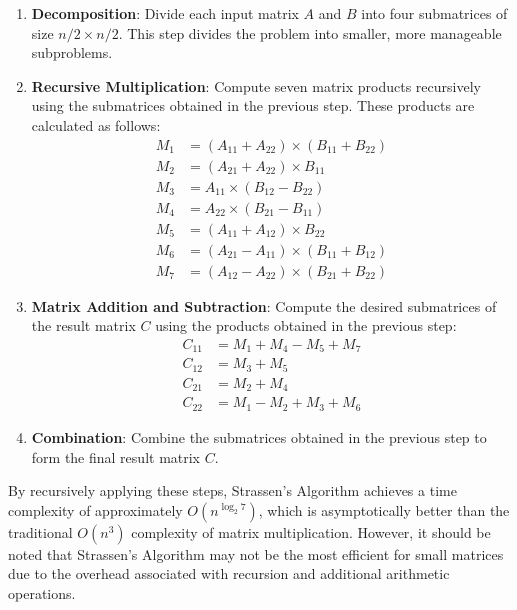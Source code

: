 \documentclass[12pt]{book} %
\begin{document}
\begin{enumerate}
    \item \textbf{Decomposition}: Divide each input matrix $A$ and $B$ into four submatrices of size $n/2 \times n/2$. This step divides the problem into smaller, more manageable subproblems.
    
    \item \textbf{Recursive Multiplication}: Compute seven matrix products recursively using the submatrices obtained in the previous step. These products are calculated as follows:
    \begin{align*}
        M_1 &= (A_{11} + A_{22}) \times (B_{11} + B_{22}) \\
        M_2 &= (A_{21} + A_{22}) \times B_{11} \\
        M_3 &= A_{11} \times (B_{12} - B_{22}) \\
        M_4 &= A_{22} \times (B_{21} - B_{11}) \\
        M_5 &= (A_{11} + A_{12}) \times B_{22} \\
        M_6 &= (A_{21} - A_{11}) \times (B_{11} + B_{12}) \\
        M_7 &= (A_{12} - A_{22}) \times (B_{21} + B_{22})
    \end{align*}
    
    \item \textbf{Matrix Addition and Subtraction}: Compute the desired submatrices of the result matrix $C$ using the products obtained in the previous step:
    \begin{align*}
        C_{11} &= M_1 + M_4 - M_5 + M_7 \\
        C_{12} &= M_3 + M_5 \\
        C_{21} &= M_2 + M_4 \\
        C_{22} &= M_1 - M_2 + M_3 + M_6
    \end{align*}
    
    \item \textbf{Combination}: Combine the submatrices obtained in the previous step to form the final result matrix $C$.
\end{enumerate}

By recursively applying these steps, Strassen's Algorithm achieves a time complexity of approximately $O(n^{\log_2{7}})$, which is asymptotically better than the traditional $O(n^3)$ complexity of matrix multiplication. However, it should be noted that Strassen's Algorithm may not be the most efficient for small matrices due to the overhead associated with recursion and additional arithmetic operations.
\end{document}
